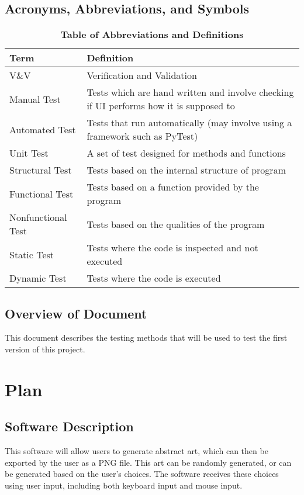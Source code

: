\documentclass[12pt, titlepage]{article}
\begin{document}
\subsection{Acronyms, Abbreviations, and Symbols}
\begin{table}[H]
\caption{\textbf{Table of Abbreviations and Definitions}} \label{Table}
\begin{tabularx}{\textwidth}{p{3cm}X}
\toprule
\textbf{Term} & \textbf{Definition} \\
\midrule
V\&V & Verification and Validation\\
Manual Test & Tests which are hand written and involve checking if UI performs how it is supposed to\\
Automated Test & Tests that run automatically (may involve using a framework such as PyTest)\\
Unit Test & A set of test designed for methods and functions\\
Structural Test & Tests based on the internal structure of program\\
Functional Test & Tests based on a function provided by the program\\
Nonfunctional Test & Tests based on the qualities of the program\\
Static Test & Tests where the code is inspected and not executed\\
Dynamic Test & Tests where the code is executed\\
\bottomrule
\end{tabularx}
\end{table}



\subsection{Overview of Document}

This document describes the testing methods that will be used to test the first version of this project.

\section{Plan}
	
\subsection{Software Description}
This software will allow users to generate abstract art, which can then be exported by the user as a PNG file. This art can be randomly generated, or can be generated based on the user's choices. The software receives these choices using user input, including both keyboard input and mouse input.
\end{document}
